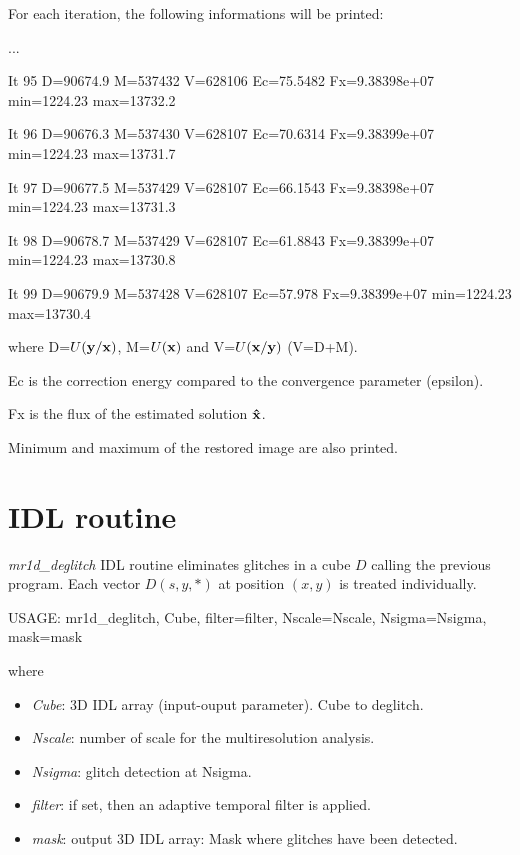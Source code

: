 For each iteration, the following informations will be printed:

...

It 95 D=90674.9 M=537432 V=628106 Ec=75.5482 Fx=9.38398e+07 min=1224.23 max=13732.2

It 96 D=90676.3 M=537430 V=628107 Ec=70.6314 Fx=9.38399e+07 min=1224.23 max=13731.7

It 97 D=90677.5 M=537429 V=628107 Ec=66.1543 Fx=9.38398e+07 min=1224.23 max=13731.3

It 98 D=90678.7 M=537429 V=628107 Ec=61.8843 Fx=9.38399e+07 min=1224.23 max=13730.8

It 99 D=90679.9 M=537428 V=628107 Ec=57.978 Fx=9.38399e+07 min=1224.23 max=13730.4
 
where D=$U({\bf y/x})$, M=$U({\bf x})$ and V=$U({\bf x/y})$ (V=D+M). 

Ec is the correction energy compared
to the convergence parameter (epsilon).

Fx is the flux of the estimated
solution $\bf \hat x$.

Minimum and maximum of the restored image are also printed.


\section*{IDL routine}
{\em mr1d\_deglitch} IDL routine eliminates glitches in 
a cube $D$ calling the previous program. Each vector $D(s,y,*)$
at position $(x,y)$ is treated individually. 
\begin{center}
     USAGE: mr1d\_deglitch, Cube, filter=filter, Nscale=Nscale, Nsigma=Nsigma, mask=mask
\end{center}
where 
\begin{itemize}
\item {\em Cube}: 3D IDL array (input-ouput parameter). Cube to deglitch.
\item {\em Nscale}: number of scale for the multiresolution analysis.
\item {\em Nsigma}: glitch detection at Nsigma.
\item {\em filter}: if set, then an adaptive temporal filter is applied.
\item {\em mask}: output 3D IDL array: Mask where glitches have been detected.
\end{itemize}
